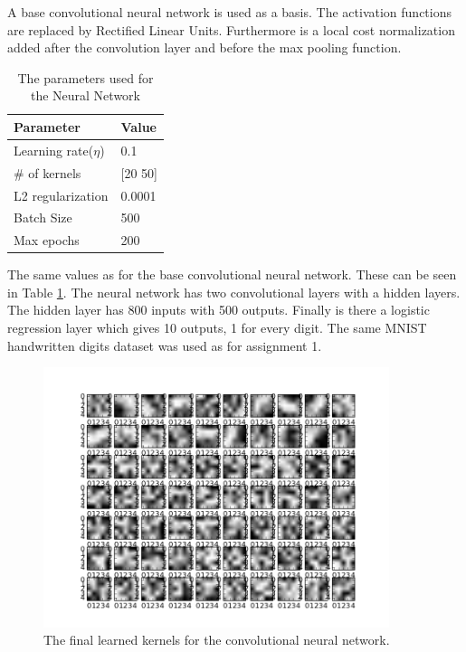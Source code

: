 
A base convolutional neural network is used as a basis. The activation functions are replaced by Rectified Linear Units. Furthermore is a local cost normalization added after the convolution layer and before the max pooling function. 

\begin{table}[ht!]
\centering
\begin{tabular}{ll}
\textbf{Parameter}           & \textbf{Value} \\ \hline  
Learning rate($\eta$) & 0.1   \\
\# of kernels   		& [20 50]   \\
L2 regularization   & 0.0001 \\
Batch Size          & 500     \\
Max epochs          & 200   \\   
\end{tabular}
\caption{The parameters used for the Neural Network}
\label{parameters2}
\end{table}

The same values as for the base convolutional neural network. These can be seen in Table \ref{parameters2}. The neural network has two convolutional layers with a hidden layers. The hidden layer has 800 inputs with 500 outputs. Finally is there a logistic regression layer which gives 10 outputs, 1 for every digit. The same MNIST handwritten digits dataset was used as for assignment 1.


\begin{figure}[ht!]
	\centering
	\includegraphics[width=0.9\textwidth]{./img/Exercise2/Afterlearning.png}	
	\caption{The final learned kernels for the convolutional neural network.}
	\label{fig:2:learningKernels}
\end{figure}

